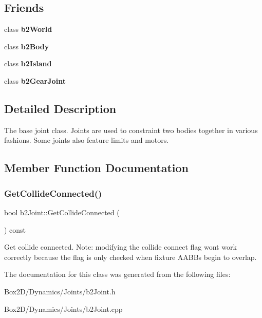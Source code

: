 \subsection*{Friends}
\begin{DoxyCompactItemize}
\item 
\mbox{\label{classb2_joint_a4bd536c5a7c0587913765bbc2693ceea}} 
class {\bfseries b2\+World}
\item 
\mbox{\label{classb2_joint_a010ab52de250e5fe30a45d642f46405b}} 
class {\bfseries b2\+Body}
\item 
\mbox{\label{classb2_joint_afc682950b8c4f251804fc1938663098b}} 
class {\bfseries b2\+Island}
\item 
\mbox{\label{classb2_joint_a13c275221e30bb485e17e4e04553cb71}} 
class {\bfseries b2\+Gear\+Joint}
\end{DoxyCompactItemize}


\subsection{Detailed Description}
The base joint class. Joints are used to constraint two bodies together in various fashions. Some joints also feature limits and motors. 

\subsection{Member Function Documentation}
\mbox{\label{classb2_joint_a48492903df96c8a7b8cad8ed826f8cb0}} 
\subsubsection{\texorpdfstring{Get\+Collide\+Connected()}{GetCollideConnected()}}
{\footnotesize\ttfamily bool b2\+Joint\+::\+Get\+Collide\+Connected (\begin{DoxyParamCaption}{ }\end{DoxyParamCaption}) const\hspace{0.3cm}{\ttfamily [inline]}}

Get collide connected. Note\+: modifying the collide connect flag won\textquotesingle{}t work correctly because the flag is only checked when fixture A\+A\+B\+Bs begin to overlap. 

The documentation for this class was generated from the following files\+:\begin{DoxyCompactItemize}
\item 
Box2\+D/\+Dynamics/\+Joints/b2\+Joint.\+h\item 
Box2\+D/\+Dynamics/\+Joints/b2\+Joint.\+cpp\end{DoxyCompactItemize}
